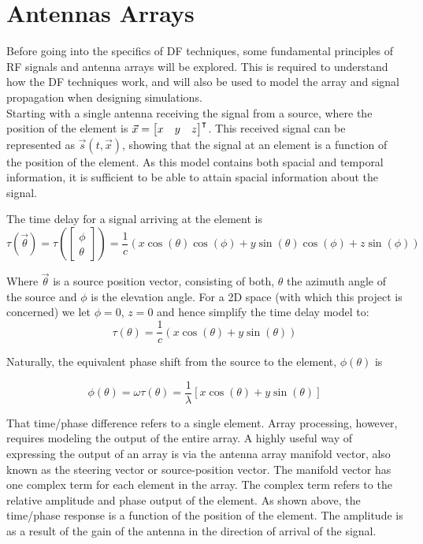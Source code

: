 \section{Antennas Arrays}
Before going into the specifics of DF techniques, some fundamental principles of RF signals and antenna arrays will be explored. This is required to understand how the DF techniques work, and will also be used to model the array and signal propagation when designing simulations.
\\

Starting with a single antenna receiving the signal from a source, where the position of the element is \(\vec{x} = \begin{bmatrix}x & y & z \end{bmatrix}^\intercal\). 
This received signal can be represented as \(\vec{s}(t, \vec{x})\), showing that the signal at an element is a function of the position of the element.
As this model contains both spacial and temporal information, it is sufficient to be able to attain spacial information about the signal\cite{krim1996two}.

The time delay for a signal arriving at the element is
\begin{equation}
  \tau(\vec{\theta}) 
 = \tau( \begin{bmatrix} \phi \\ \theta \end{bmatrix} )
 = \frac{1}{c} \left( x\cos(\theta)\cos(\phi) + y\sin(\theta)\cos(\phi) + z\sin(\phi) \right)
\end{equation}

Where \(\vec{\theta}\) is a source position vector, consisting of both, \(\theta\) the azimuth angle of the source and \(\phi\) is the elevation angle.
For a 2D space (with which this project is concerned) we let \(\phi= 0\), \(z = 0\) and hence simplify the time delay model to:
\begin{equation}
  \tau(\theta) = \frac{1}{c} \left( x\cos(\theta) + y\sin(\theta) \right)
\end{equation}

Naturally, the equivalent phase shift from the source to the element, \(\phi(\theta)\) is

\begin{equation}
  \phi(\theta) = \omega\tau(\theta) = \frac{1}{\lambda} [ x\cos(\theta) + y\sin(\theta) ]
\end{equation}

That time/phase difference refers to a single element. 
Array processing, however, requires modeling the output of the entire array. 
A highly useful way of expressing the output of an array is via the antenna array manifold vector, also known as the steering vector or source-position vector. 
The manifold vector has one complex term for each element in the array. 
The complex term refers to the relative amplitude and phase output of the element. 
As shown above, the time/phase response is a function of the position of the element. 
The amplitude is as a result of the gain of the antenna in the direction of arrival of the signal. 

